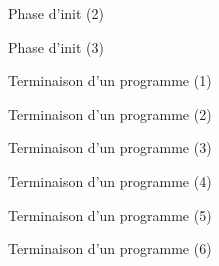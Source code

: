 \documentclass[12pt,t]{beamer}
\begin{document}
\begin{frame}{Phase d'init (2)}
\end{frame}

\begin{frame}{Phase d'init (3)}
\end{frame}

\begin{frame}{Terminaison d'un programme (1)}
\end{frame}

\begin{frame}{Terminaison d'un programme (2)}
\end{frame}

\begin{frame}{Terminaison d'un programme (3)}
\end{frame}

\begin{frame}{Terminaison d'un programme (4)}
\end{frame}

\begin{frame}{Terminaison d'un programme (5)}
\end{frame}

\begin{frame}{Terminaison d'un programme (6)}
\end{frame}
\end{document}
